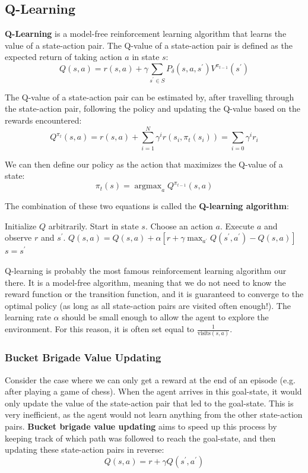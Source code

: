 \documentclass[12pt]{article}
\DeclareMathOperator*{\argmax}{argmax}
\begin{document}
\subsection{Q-Learning}
\textbf{Q-Learning} is a model-free reinforcement learning algorithm that learns the value of a state-action pair.
The Q-value of a state-action pair is defined as the expected return of taking action $a$ in state $s$:
\[ Q(s, a) = r(s, a) + \gamma \sum_{s^\prime \in S} P_\delta(s, a, s^\prime) V^{\pi_{t - 1}}(s^\prime) \]

\noindent
The Q-value of a state-action pair can be estimated by, after travelling through the state-action pair, following the policy and updating the Q-value based on the rewards encountered:
\[ Q^{\pi_t}(s, a) = r(s, a) + \sum_{i = 1}^N \gamma^i r(s_i, \pi_t(s_i)) = \sum_{i = 0} \gamma^i r_i \]

\noindent
We can then define our policy as the action that maximizes the Q-value of a state:
\[ \pi_t(s) = \argmax_a Q^{\pi_{t - 1}}(s, a) \]

\noindent
The combination of these two equations is called the \textbf{Q-learning algorithm}:

\newpage
\begin{algorithm}
    \caption{Q-Learning}
    \begin{algorithmic}[1]
        \State Initialize $Q$ arbitrarily.
        \State Start in state $s$.
            \State Choose an action $a$.
            \State Execute $a$ and observe $r$ and $s^\prime$.
            \State $Q(s, a) = Q(s, a) + \alpha \left[ r + \gamma \max_{a^\prime} Q(s^\prime, a^\prime) - Q(s, a) \right]$
            \State $s = s^\prime$
        \EndWhile
    \end{algorithmic}
\end{algorithm}

\noindent
Q-learning is probably the most famous reinforcement learning algorithm our there.
It is a model-free algorithm, meaning that we do not need to know the reward function or the transition function, and it is guaranteed to converge to the optimal policy (as long as all state-action pairs are visited often enough!).
The learning rate $\alpha$ should be small enough to allow the agent to explore the environment.
For this reason, it is often set equal to $\frac{1}{\text{visits}(s, a)}$.

\subsubsection{Bucket Brigade Value Updating}
Consider the case where we can only get a reward at the end of an episode (e.g. after playing a game of chess).
When the agent arrives in this goal-state, it would only update the value of the state-action pair that led to the goal-state.
This is very inefficient, as the agent would not learn anything from the other state-action pairs.
\textbf{Bucket brigade value updating} aims to speed up this process by keeping track of which path was followed to reach the goal-state, and then updating these state-action pairs in reverse:
\[ Q(s, a) = r + \gamma Q(s^\prime, a^\prime) \]
\end{document}
